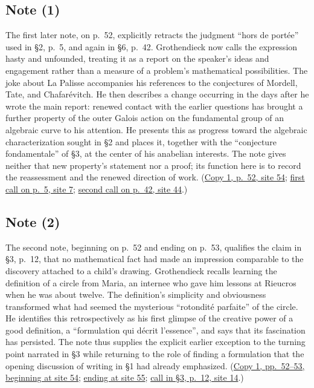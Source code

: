 \documentclass[11pt,a4paper]{article}
\begin{document}
\subsection*{Note (1)}
The first later note, on p.~52, explicitly retracts the judgment ``hors
de portée'' used in \S2, p.~5, and again in \S6, p.~42. Grothendieck now
calls the expression hasty and unfounded, treating it as a report on the
speaker's ideas and engagement rather than a measure of a problem's
mathematical possibilities. The joke about La Palisse accompanies his
references to the conjectures of Mordell, Tate, and Chafarévitch. He then
describes a change occurring in the days after he wrote the main report:
renewed contact with the earlier questions has brought a further property
of the outer Galois action on the fundamental group of an algebraic curve
to his attention. He presents this as progress toward the algebraic
characterization sought in \S2 and places it, together with the
``conjecture fondamentale'' of \S3, at the center of his anabelian
interests. The note gives neither that new property's statement nor a
proof; its function here is to record the reassessment and the renewed
direction of work.
(\href{https://grothendieck.umontpellier.fr/web/viewer.html?file=../119.pdf\#page=55}{Copy 1, p.~52, site 54};
\href{https://grothendieck.umontpellier.fr/web/viewer.html?file=../119.pdf\#page=8}{first call on p.~5, site 7};
\href{https://grothendieck.umontpellier.fr/web/viewer.html?file=../119.pdf\#page=45}{second call on p.~42, site 44}.)


\subsection*{Note (2)}
The second note, beginning on p.~52 and ending on p.~53, qualifies the
claim in \S3, p.~12, that no mathematical fact had made an impression
comparable to the discovery attached to a child's drawing. Grothendieck
recalls learning the definition of a circle from Maria, an internee
who gave him lessons at Rieucros when he was about twelve. The definition's
simplicity and obviousness transformed what had seemed the mysterious
``rotondité parfaite'' of the circle. He identifies this retrospectively
as his first glimpse of the creative power of a good definition, a
``formulation qui décrit l'essence'', and says that its fascination has
persisted. The note thus supplies the explicit earlier exception to the
turning point narrated in \S3 while returning to the role of finding a
formulation that the opening discussion of writing in \S1 had already
emphasized.
(\href{https://grothendieck.umontpellier.fr/web/viewer.html?file=../119.pdf\#page=55}{Copy 1, pp.~52--53, beginning at site 54};
\href{https://grothendieck.umontpellier.fr/web/viewer.html?file=../119.pdf\#page=56}{ending at site 55};
\href{https://grothendieck.umontpellier.fr/web/viewer.html?file=../119.pdf\#page=15}{call in \S3, p.~12, site 14}.)
\end{document}
